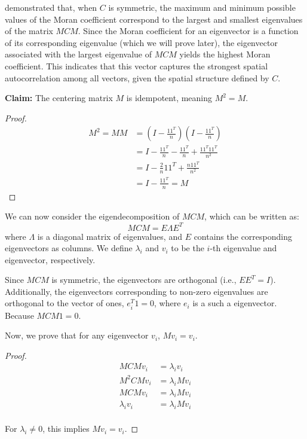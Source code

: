 \documentclass[12pt]{article}
\begin{document}
\citet{de1984extreme} demonstrated that, when \( C \) is symmetric, the maximum and minimum possible values of the Moran coefficient correspond to the largest and smallest eigenvalues of the matrix \( MCM \). Since the Moran coefficient for an eigenvector is a function of its corresponding eigenvalue (which we will prove later), the eigenvector associated with the largest eigenvalue of \( MCM \) yields the highest Moran coefficient. This indicates that this vector captures the strongest spatial autocorrelation among all vectors, given the spatial structure defined by \( C \).

{\bf Claim:} The centering matrix \( M \) is idempotent, meaning \( M^2 = M \).

\begin{proof}
  \begin{align*}
    M^2 = M M & = \left( I - \frac{1 1^T}{n} \right) \left( I - \frac{1 1^T}{n} \right) \\
              & = I - \frac{1 1^T}{n} - \frac{1 1^T}{n} + \frac{1 1^T 1 1^T}{n^2} \\
              & = I - \frac{2}{n} 1 1^T + \frac{n 1 1^T}{n^2} \\
              & = I - \frac{1 1^T}{n} = M
  \end{align*}
\end{proof}

We can now consider the eigendecomposition of \( M C M \), which can be written as:
\[
  M C M = E \Lambda E^{T}
\]
where \( \Lambda \) is a diagonal matrix of eigenvalues, and \( E \) contains the corresponding eigenvectors as columns. We define \( \lambda_i \) and \( v_i \) to be the \( i \)-th eigenvalue and eigenvector, respectively.

Since \( M C M \) is symmetric, the eigenvectors are orthogonal (i.e., \( E E^T = I \)). Additionally, the eigenvectors corresponding to non-zero eigenvalues are orthogonal to the vector of ones, \( e_i^T 1 = 0 \), where \( e_i \) is a such a eigenvector. Because \( M C M 1 = 0 \).

Now, we prove that for any eigenvector \( v_i \), \( M v_i = v_i \).
\begin{proof}
  \begin{align*}
    M C M v_i & = \lambda_i v_i \\
    M^2 C M v_i & = \lambda_i M v_i \\
    M C M v_i & = \lambda_i M v_i \\
    \lambda_i v_i & = \lambda_i M v_i \\
  \end{align*}

  For \( \lambda_i \neq 0 \), this implies \( M v_i = v_i \).
\end{proof}
\end{document}
